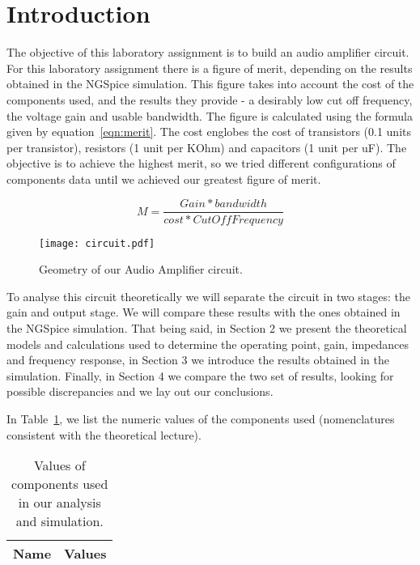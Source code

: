 \section{Introduction}
\label{sec:introduction}
The objective of this laboratory assignment is to build an audio amplifier circuit. 
For this laboratory assignment there is a figure of merit, depending on the results obtained in the NGSpice simulation. This figure takes into account the cost of the components used, and the results they provide - a desirably low cut off frequency, the voltage gain and usable bandwidth. The figure is calculated using the formula given by equation~\ref{eqn:merit}. The cost englobes the cost of transistors (0.1 units per transistor), resistors (1 unit per KOhm) and capacitors (1 unit per uF). The objective is to achieve the highest merit, so we tried different configurations of components data until we achieved our greatest figure of merit.

\begin{equation}
\label{eqn:merit}
M=\frac{Gain*bandwidth}{cost*CutOffFrequency}
\end{equation}

\begin{figure}[h] \centering
\texttt{[image: circuit.pdf]}
\caption{Geometry of our Audio Amplifier circuit.}
\end{figure}

To analyse this circuit theoretically we will separate the circuit in two stages: the gain and output stage. We will compare these results with the ones obtained in the NGSpice simulation.
That being said, in Section 2 we present the theoretical models and calculations used to determine the operating point, gain, impedances and frequency response, in Section 3 we introduce the results obtained in the simulation. Finally, in Section 4 we compare the two set of results, looking for possible discrepancies and we lay out our conclusions.

In Table~\ref{tab:data}, we list the numeric values of the components used (nomenclatures consistent with the theoretical lecture).

\begin{table}[h]
  \centering
  \begin{tabular}{|l|r|}
    \hline    
    {\bf Name} & {\bf Values} \\ \hline
     
  \end{tabular}
  \caption{Values of components used in our analysis and simulation.}
  \label{tab:data}
\end{table}
\pagebreak
